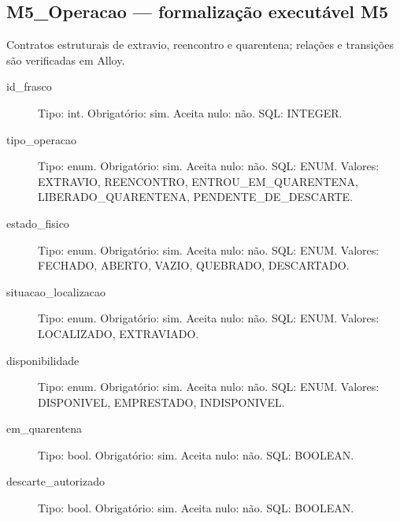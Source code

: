 \subsection*{M5\_Operacao --- formalização executável M5}
Contratos estruturais de extravio, reencontro e quarentena; relações e transições são verificadas em Alloy.
\begin{description}
\item[id\_frasco] Tipo: int. Obrigatório: sim. Aceita nulo: não.
SQL: INTEGER.
\item[tipo\_operacao] Tipo: enum. Obrigatório: sim. Aceita nulo: não.
SQL: ENUM.
Valores: EXTRAVIO, REENCONTRO, ENTROU\_EM\_QUARENTENA, LIBERADO\_QUARENTENA, PENDENTE\_DE\_DESCARTE.
\item[estado\_fisico] Tipo: enum. Obrigatório: sim. Aceita nulo: não.
SQL: ENUM.
Valores: FECHADO, ABERTO, VAZIO, QUEBRADO, DESCARTADO.
\item[situacao\_localizacao] Tipo: enum. Obrigatório: sim. Aceita nulo: não.
SQL: ENUM.
Valores: LOCALIZADO, EXTRAVIADO.
\item[disponibilidade] Tipo: enum. Obrigatório: sim. Aceita nulo: não.
SQL: ENUM.
Valores: DISPONIVEL, EMPRESTADO, INDISPONIVEL.
\item[em\_quarentena] Tipo: bool. Obrigatório: sim. Aceita nulo: não.
SQL: BOOLEAN.
\item[descarte\_autorizado] Tipo: bool. Obrigatório: sim. Aceita nulo: não.
SQL: BOOLEAN.
\end{description}

